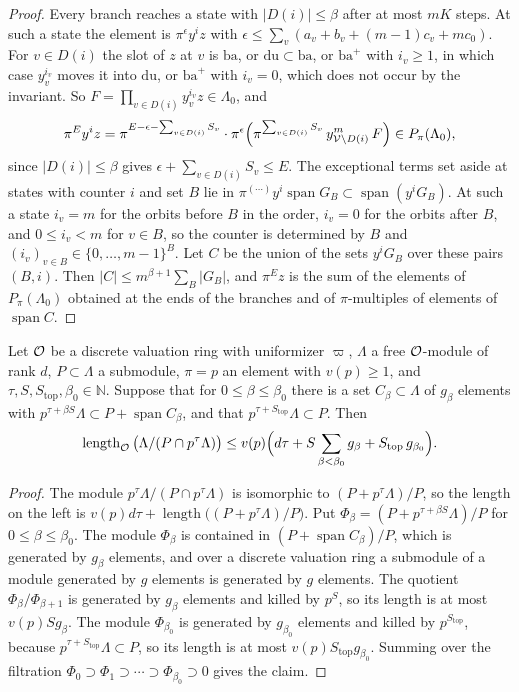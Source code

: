 \begin{proof}
Every branch reaches a state with $\lvert D(i)\rvert\le\beta$ after at most $mK$ steps. At such a state the element is $\pi^\epsilon y^iz$ with $\epsilon\le\sum_v(a_v+b_v+(m-1)c_v+mc_0)$. For $v\in D(i)$ the slot of $z$ at $v$ is $\mathrm{ba}$, or $\mathrm{du}\subset\mathrm{ba}$, or $\mathrm{ba}^+$ with $i_v\ge1$, in which case $y_v^{i_v}$ moves it into $\mathrm{du}$, or $\mathrm{ba}^+$ with $i_v=0$, which does not occur by the invariant. So $F=\prod_{v\in D(i)}y_v^{i_v}z\in\Lambda_0$, and
\[
\pi^{E}y^iz=\pi^{E-\epsilon-\sum_{v\in D(i)}S_v}\cdot\pi^{\epsilon}\Big(\pi^{\sum_{v\in D(i)}S_v}\,y_{\mathcal V\setminus D(i)}^m\,F\Big)\in P_\pi(\Lambda_0),
\]
since $\lvert D(i)\rvert\le\beta$ gives $\epsilon+\sum_{v\in D(i)}S_v\le E$. The exceptional terms set aside at states with counter $i$ and set $B$ lie in $\pi^{(\cdots)}y^i\operatorname{span}G_B\subset\operatorname{span}(y^iG_B)$. At such a state $i_v=m$ for the orbits before $B$ in the order, $i_v=0$ for the orbits after $B$, and $0\le i_v<m$ for $v\in B$, so the counter is determined by $B$ and $(i_v)_{v\in B}\in\{0,\dots,m-1\}^B$. Let $C$ be the union of the sets $y^iG_B$ over these pairs $(B,i)$. Then $\lvert C\rvert\le m^{\beta+1}\sum_B\lvert G_B\rvert$, and $\pi^Ez$ is the sum of the elements of $P_\pi(\Lambda_0)$ obtained at the ends of the branches and of $\pi$-multiples of elements of $\operatorname{span}C$.
\end{proof}

\begin{lemma}\label{r2:layers}
Let $\mathcal O$ be a discrete valuation ring with uniformizer $\varpi$, $\Lambda$ a free $\mathcal O$-module of rank $d$, $P\subset\Lambda$ a submodule, $\pi=p$ an element with $v(p)\ge1$, and $\tau,S,S_{\mathrm{top}},\beta_0\in\mathbb N$. Suppose that for $0\le\beta\le\beta_0$ there is a set $C_\beta\subset\Lambda$ of $g_\beta$ elements with $p^{\tau+\beta S}\Lambda\subset P+\operatorname{span}C_\beta$, and that $p^{\tau+S_{\mathrm{top}}}\Lambda\subset P$. Then
\[
\operatorname{length}_\mathcal O\big(\Lambda/(P\cap p^\tau\Lambda)\big)\le v(p)\Big(d\tau+S\sum_{\beta<\beta_0}g_\beta+S_{\mathrm{top}}\,g_{\beta_0}\Big).
\]
\end{lemma}

\begin{proof}
The module $p^\tau\Lambda/(P\cap p^\tau\Lambda)$ is isomorphic to $(P+p^\tau\Lambda)/P$, so the length on the left is $v(p)d\tau+\operatorname{length}\big((P+p^\tau\Lambda)/P\big)$. Put $\Phi_\beta=(P+p^{\tau+\beta S}\Lambda)/P$ for $0\le\beta\le\beta_0$. The module $\Phi_\beta$ is contained in $(P+\operatorname{span}C_\beta)/P$, which is generated by $g_\beta$ elements, and over a discrete valuation ring a submodule of a module generated by $g$ elements is generated by $g$ elements. The quotient $\Phi_\beta/\Phi_{\beta+1}$ is generated by $g_\beta$ elements and killed by $p^S$, so its length is at most $v(p)Sg_\beta$. The module $\Phi_{\beta_0}$ is generated by $g_{\beta_0}$ elements and killed by $p^{S_{\mathrm{top}}}$, because $p^{\tau+S_{\mathrm{top}}}\Lambda\subset P$, so its length is at most $v(p)S_{\mathrm{top}}g_{\beta_0}$. Summing over the filtration $\Phi_0\supset\Phi_1\supset\cdots\supset\Phi_{\beta_0}\supset0$ gives the claim.
\end{proof}

